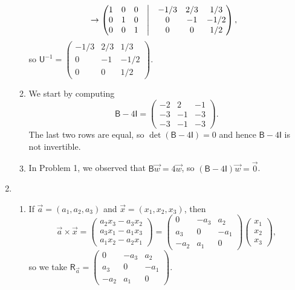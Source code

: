 \begin{enumerate}
\begin{enumerate}
\begin{align*}
&\rightarrow \begin{pmatrix} 1 & 0 & 0 & \bigm| & -1/3 & 2/3 & 1/3 \\ 0 & 1 & 0 & \bigm| & 0 & -1 & -1/2 \\ 0 & 0 & 1 & \bigm| & 0 & 0 & 1/2 \end{pmatrix},
\end{align*}
so $\mathsf{U}^{-1} = \begin{pmatrix} -1/3 & 2/3 & 1/3 \\ 0 & -1 & -1/2 \\ 0 & 0 & 1/2 \end{pmatrix}$.
\newpage
\item We start by computing
\begin{equation*}
\mathsf{B} - 4\mathsf{I} = \begin{pmatrix} -2 & 2 & -1 \\ -3 & -1 & -3 \\ -3 & -1 & -3 \end{pmatrix}.
\end{equation*}
The last two rows are equal, so $\det(\mathsf{B} - 4\mathsf{I}) = 0$ and hence $\mathsf{B} - 4\mathsf{I}$ is not invertible.
\item In Problem 1, we observed that $\mathsf{B}\vec{w} = 4\vec{w}$, so $(\mathsf{B} - 4\mathsf{I})\vec{w} = \vec{0}$.
\end{enumerate}
\item \begin{enumerate}
\item If $\vec{a} = (a_1,a_2,a_3)$ and $\vec{x} = (x_1,x_2,x_3)$, then
\begin{equation*}
\vec{a}\times\vec{x} = \begin{pmatrix} a_2x_3 - a_3x_2 \\ a_3x_1 - a_1x_3 \\ a_1x_2 - a_2x_1 \end{pmatrix} = \begin{pmatrix} 0 & -a_3 & a_2 \\ a_3 & 0 & -a_1 \\ -a_2 & a_1 & 0\end{pmatrix}\begin{pmatrix} x_1 \\ x_2 \\ x_3 \end{pmatrix},
\end{equation*}
so we take $\mathsf{R}_{\vec{a}} = \begin{pmatrix} 0 & -a_3 & a_2 \\ a_3 & 0 & -a_1 \\ -a_2 & a_1 & 0\end{pmatrix}$.

\end{enumerate}
\end{enumerate}
